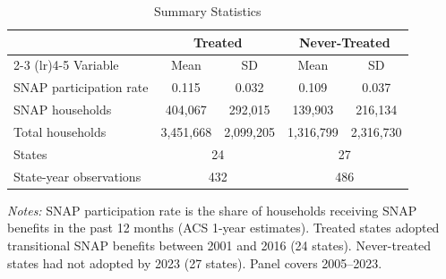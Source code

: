 
\begin{table}[H]
\centering
\caption{Summary Statistics}
\label{tab:summary}
\begin{threeparttable}
\begin{tabular}{lcccc}
\toprule
 & \multicolumn{2}{c}{Treated} & \multicolumn{2}{c}{Never-Treated} \\
\cmidrule(lr){2-3} \cmidrule(lr){4-5}
Variable & Mean & SD & Mean & SD \\
\midrule
SNAP participation rate & 0.115 & 0.032 & 0.109 & 0.037 \\
SNAP households & 404,067 & 292,015 & 139,903 & 216,134 \\
Total households & 3,451,668 & 2,099,205 & 1,316,799 & 2,316,730 \\
\midrule
States & \multicolumn{2}{c}{24} & \multicolumn{2}{c}{27} \\
State-year observations & \multicolumn{2}{c}{432} & \multicolumn{2}{c}{486} \\
\bottomrule
\end{tabular}
\begin{tablenotes}[flushleft]
\small
\item \textit{Notes:} SNAP participation rate is the share of households receiving SNAP benefits in the past 12 months (ACS 1-year estimates). Treated states adopted transitional SNAP benefits between 2001 and 2016 (24 states). Never-treated states had not adopted by 2023 (27 states). Panel covers 2005--2023.
\end{tablenotes}
\end{threeparttable}
\end{table}
